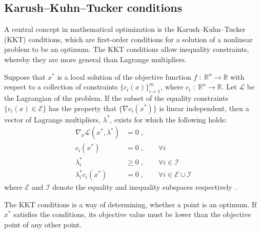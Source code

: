 \subsection{Karush–Kuhn–Tucker conditions}
A central concept in mathematical optimization is the Karush–Kuhn–Tucker (KKT) conditions, which are first-order conditions for a solution of a nonlinear problem to be an optimum. The KKT conditions allow inequality constraints, whereby they are more general than Lagrange multipliers. 
\begin{theorem}
	Suppose that $x^*$ is a local solution of the objective function $f \; : \; \mathbb{R}^n \to \mathbb{R}$ with respect to a collection of constraints $\{ c_i(x)  \}_{i=1}^{m}$, where $c_i \; : \; \mathbb{R}^n \to \mathbb{R}$. Let $\mathcal{L}$ be the Lagrangian of the problem. If the subset of the equality constraints $\{ c_i(x) \in \mathcal{E}\}$ has the property that $\{ \nabla c_i(x^*)\}$ is linear independent, then a vector of Lagrange multipliers, $\lambda^*$, exists for which the following holds:
	\begin{subequations}	
	\begin{align}
		\nabla_x \mathcal{L}(x^*,\lambda^*) &= 0 \; ,  \\
		c_i(x^*) &= 0 \; , \qquad \forall i \\
		\lambda_{i}^* &\geq 0 \; , \qquad \forall i \in \mathcal{I} \\
		\lambda_{i}^* c_i(x^*) &= 0 \; , \qquad \forall i \in \mathcal{E} \cup \mathcal{I}
	\end{align}
	\end{subequations}	
	where $\mathcal{E}$ and $\mathcal{I}$ denote the equality and inequality subspaces respectively \cite{wright}.  
\end{theorem}
The KKT conditions is a way of determining, whether a point is an optimum. If $x^*$ satisfies the conditions, its objective value must be lower than the objective point of any other point.


